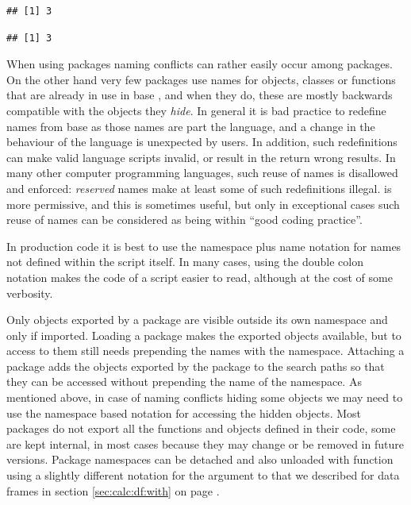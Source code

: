 \documentclass[krantz2]{krantz}\usepackage{knitr}%
\begin{document}
\begin{warningbox}
\begin{knitrout}\footnotesize
{}\color{fgcolor}\begin{kframe}
\begin{alltt}
 
\hlstd{(}\hlopt{:}\hlstd{)}
\end{alltt}
\begin{verbatim}
## [1] 3
\end{verbatim}
\begin{alltt}
\hlopt{::}\hlstd{(}\hlopt{:}\hlstd{)}
\end{alltt}
\begin{verbatim}
## [1] 3
\end{verbatim}
\end{kframe}
\end{knitrout}

When using packages naming conflicts can rather easily occur among packages. On the other hand very few packages use names for objects, classes or functions that are already in use in base \Rlang, and when they do, these are mostly backwards compatible with the objects they \emph{hide}. In general it is bad practice to redefine names from base \Rlang as those names are part the language, and a change in the behaviour of the \Rlang language is unexpected by users. In addition, such redefinitions can make valid \Rlang language scripts invalid, or result in the return wrong results. In many other computer programming languages, such reuse of names is disallowed and enforced: \emph{reserved} names make at least some of such redefinitions illegal. \Rlang is more permissive, and this is sometimes useful, but only in exceptional cases such reuse of names can be considered as being within ``good coding practice''.

In production code it is best to use the namespace plus name notation for names not defined within the script itself. In many cases, using the double colon notation makes the code of a script easier to read, although at the cost of some verbosity.
\end{warningbox}

Only objects exported by a package are visible outside its own namespace and only if imported. Loading a package makes the exported objects available, but to access to them still needs prepending the names with the namespace. Attaching a package adds the objects exported by the package to the search paths so that they can be accessed without prepending the name of the namespace. As mentioned above, in case of naming conflicts hiding some objects we may need to use the namespace based notation for accessing the hidden objects. Most packages do not export all the functions and objects defined in their code, some are kept internal, in most cases because they may change or be removed in future versions. Package namespaces can be detached and also unloaded with function  using a slightly different notation for the argument to that we described for data frames in section \ref{sec:calc:df:with} on page \pageref{sec:calc:df:with}.
\end{document}
